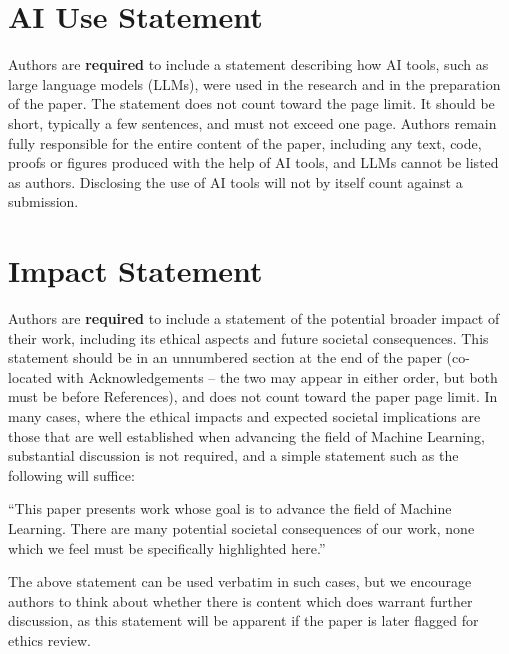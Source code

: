 \documentclass{article}
\theoremstyle{plain}
\theoremstyle{definition}
\theoremstyle{remark}
\begin{document}

\section*{AI Use Statement}

Authors are \textbf{required} to include a statement describing how AI tools,
such as large language models (LLMs), were used in the research and in the
preparation of the paper. The statement does not count toward the page limit.
It should be short, typically a few sentences, and must not exceed one page.
Authors remain fully responsible for the entire content of the paper,
including any text, code, proofs or figures produced with the help of AI
tools, and LLMs cannot be listed as authors. Disclosing the use of AI tools
will not by itself count against a submission.


\section*{Impact Statement}

Authors are \textbf{required} to include a statement of the potential broader
impact of their work, including its ethical aspects and future societal
consequences. This statement should be in an unnumbered section at the end of
the paper (co-located with Acknowledgements -- the two may appear in either
order, but both must be before References), and does not count toward the paper
page limit. In many cases, where the ethical impacts and expected societal
implications are those that are well established when advancing the field of
Machine Learning, substantial discussion is not required, and a simple
statement such as the following will suffice:

``This paper presents work whose goal is to advance the field of Machine
Learning. There are many potential societal consequences of our work, none
which we feel must be specifically highlighted here.''

The above statement can be used verbatim in such cases, but we encourage
authors to think about whether there is content which does warrant further
discussion, as this statement will be apparent if the paper is later flagged
for ethics review.

\nocite{langley00}
\end{document}
